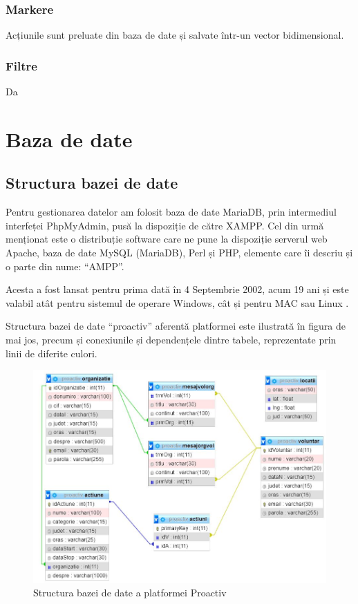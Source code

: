 \documentclass[12pt,a4paper]{report}
\begin{document}
\subsection{Markere}
\par
Acțiunile sunt preluate din baza de date și salvate într-un vector bidimensional.

\subsection{Filtre}
\par
Da


\chapter{Baza de date}

\section{Structura bazei de date}
\par
Pentru gestionarea datelor am folosit baza de date MariaDB, prin intermediul interfeței PhpMyAdmin, pusă la dispoziție de către XAMPP. Cel din urmă menționat este o distribuție software care ne pune la dispoziție serverul web Apache, baza de date MySQL (MariaDB), Perl și PHP, elemente care îi descriu și o parte din nume: “AMPP”. 
\par
Acesta a fost lansat pentru prima dată în 4 Septembrie 2002, acum 19 ani și este valabil atât pentru sistemul de operare Windows, cât și pentru MAC sau Linux \cite{xampp}.
\\
\par
Structura bazei de date “proactiv” aferentă platformei este ilustrată în figura de mai jos, precum și conexiunile și dependențele dintre tabele, reprezentate prin linii de diferite culori.
\\
\begin{figure}[H]
\centering
  \includegraphics[width=0.8\linewidth]{./imagini/bazadate.jpg}
  \caption{Structura bazei de date a platformei Proactiv}
\end{figure}
\end{document}
